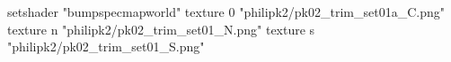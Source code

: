 setshader "bumpspecmapworld"
    texture 0 "philipk2/pk02_trim_set01a_C.png"
    texture n "philipk2/pk02_trim_set01_N.png"
    texture s "philipk2/pk02_trim_set01_S.png"
